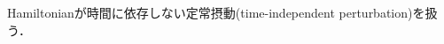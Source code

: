 \documentclass{standalone}
\begin{document}
  Hamiltonianが時間に依存しない定常摂動(time-independent perturbation)を扱う．
\end{document}
